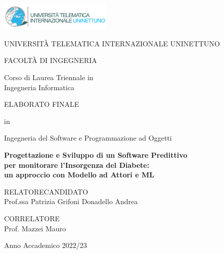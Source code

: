 \begin{titlepage}

    \begin{center}
        
        \includegraphics[width=0.4\textwidth]{images/nettuno_logo}

        \vspace{1cm}

        \huge UNIVERSITÀ TELEMATICA INTERNAZIONALE UNINETTUNO 

        \vspace{1.5cm}

        \LARGE FACOLTÀ DI INGEGNERIA \\

        \vspace{0.2cm}

        \Large Corso di Laurea Triennale in \\
        \Large Ingegneria Informatica \\
        
        \vspace{1cm}

        \large ELABORATO FINALE \\

        \vspace{0.2cm}

        \large in \\

        \vspace{0.2cm}

        \LARGE Ingegneria del Software e Programmazione ad Oggetti

        \vspace{1cm}

        \textbf{\LARGE Progettazione e Sviluppo di un Software Predittivo \\ per monitorare l'Insorgenza del Diabete: \\ un approccio con Modello ad Attori e ML}

        \vspace{1.5cm}

        \raggedright{
            \large RELATORE\hfill{CANDIDATO} \\
            \large Prof.ssa Patrizia Grifoni \hfill{Donadello Andrea}
            
            \vspace{1cm}

            \large CORRELATORE \\
            \large Prof. Mazzei Mauro
        }
        
        \centering
        
        \vfill
     
        \normalsize{Anno Accademico 2022/23}
                          
    \end{center}

 \end{titlepage}